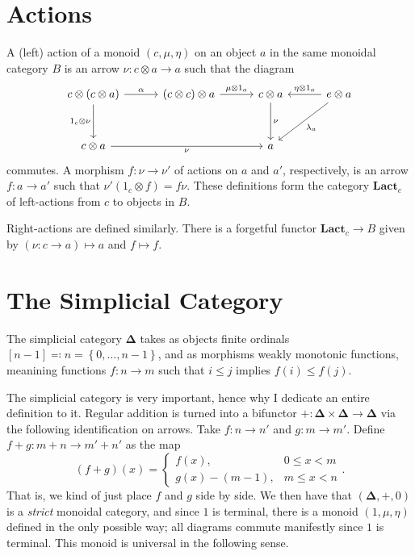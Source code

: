 \section{Actions}

\begin{definition}[Action]\label{dfn:7.4}
	A (left) action of a monoid $(c,\mu,\eta)$ on an object $a$ in the same monoidal category $B$ is an arrow $\nu : c\otimes a \to a$ such that the diagram
	\[\begin{tikzcd}[row sep = 3em, column sep = 3em]
	c\otimes (c\otimes a)\ar[" \alpha ", r] \ar[" 1_c \otimes \nu "', d]  & (c\otimes c)\otimes a \ar[" \mu \otimes 1_a ", r]  & c\otimes a \ar[" \nu ", d]  & e\otimes a \ar[" \eta \otimes 1_a "', l] \ar[" \lambda_a ", dl]  \\
	c\otimes a \ar[" \nu "', rr]  &  & a & 
	\end{tikzcd}\]
	commutes. A morphism $f : \nu \to \nu'$ of actions on $a$ and $a'$, respectively, is an arrow $f : a \to a'$ such that $\nu'(1_c \otimes f)=f\nu$. These definitions form the category $\mathbf{Lact}_c $ of left-actions from $c$ to objects in $B$.
\end{definition}
Right-actions are defined similarly. There is a forgetful functor $\mathbf{Lact} _c \to B$ given by $(\nu : c \to a)\mapsto a$ and $f\mapsto f$.

\section{The Simplicial Category}

\begin{definition}\label{dfn:7.5}
	The simplicial category $\boldsymbol{\Delta} $ takes as objects finite ordinals $[n-1]\eqqcolon n=\left\{ 0, \ldots ,n-1 \right\} $, and as morphisms weakly monotonic functions, meanining functions $f : n \to m$ such that $i\leq j$ implies $f(i)\leq f(j)$.
\end{definition}

The simplicial category is very important, hence why I dedicate an entire definition to it. Regular addition is turned into a bifunctor $+: \boldsymbol{\Delta} \times \boldsymbol{\Delta}  \to \boldsymbol{\Delta} $ via the following identification on arrows. Take $f : n \to n'$ and $g : m \to m'$. Define $f+g : m+n \to m'+n'$ as the map
\[
	(f+g)(x)=
	\begin{cases}
		f(x),&0\leq x<m\\
		g(x)-(m-1),&m\leq x<n
	\end{cases}
.\]
That is, we kind of just place $f$ and $g$ side by side. We then have that $(\boldsymbol{\Delta} ,+,0)$ is a \emph{strict} monoidal category, and since $1$ is terminal, there is a monoid $(1,\mu,\eta)$ defined in the only possible way; all diagrams commute manifestly since $1$ is terminal. This monoid is universal in the following sense.

